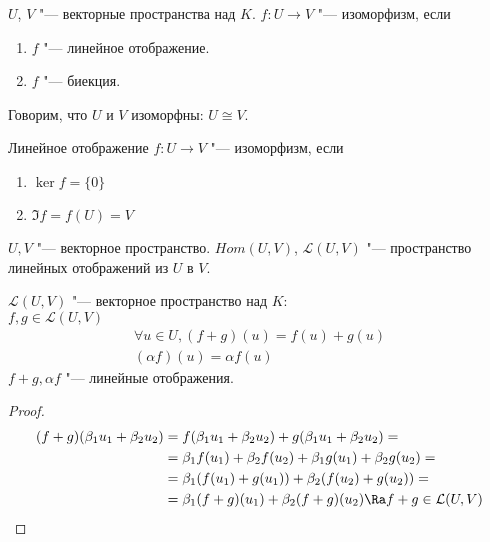 \begin{Def}
	$U$, $V$ "--- векторные пространства над $K$.
	$f \colon U \to V$ "--- изоморфизм, если
	\begin{enumerate}
		\item $f$ "--- линейное отображение.
		\item $f$ "--- биекция.
	\end{enumerate}
	Говорим, что $U$ и $V$ изоморфны: $U \cong V$.
\end{Def}

\begin{Rem}
	Линейное отображение $f\colon U \to V$ "--- изоморфизм, если
	\begin{enumerate}
		\item $\ker f = \{0\}$
		\item $\Im f = f(U) = V$
	\end{enumerate}
\end{Rem}

\begin{Def}
	$U, V$ "--- векторное пространство.
	$Hom(U, V)$, $\mathcal{L}(U, V)$ "--- пространство линейных отображений из $U$ в $V$.
\end{Def}

\begin{theorem}
	$\mathcal{L}(U, V)$ "--- векторное пространство над $K$: \\
	$f, g \in \mathcal{L}(U, V)$
	\begin{gather*}
		\forall u \in U, (f + g)(u) = f(u) + g(u) \\
		(\alpha f)(u) = \alpha f(u)
	\end{gather*}
	$f + g, \alpha f$ "--- линейные отображения.
\end{theorem}

\begin{proof}
	\begin{alignat*}{2}
		(f + g)(\beta_1u_1 + \beta_2u_2) &= f(\beta_1 u_1 + \beta_2u_2)+
			g(\beta_1u_1 + \beta_2u_2) = \\
		&=\beta_1f(u_1) + \beta_2f(u_2) + \beta_1g(u_1) + \beta_2g(u_2) = \\
		&=\beta_1(f(u_1) + g(u_1)) + \beta_2(f(u_2) + g(u_2)) = \\
		&=\beta_1(f + g)(u_1) + \beta_2(f + g)(u_2) \Ra f + g \in \mathcal{L}(U, V)
	\end{alignat*}
\end{proof}

